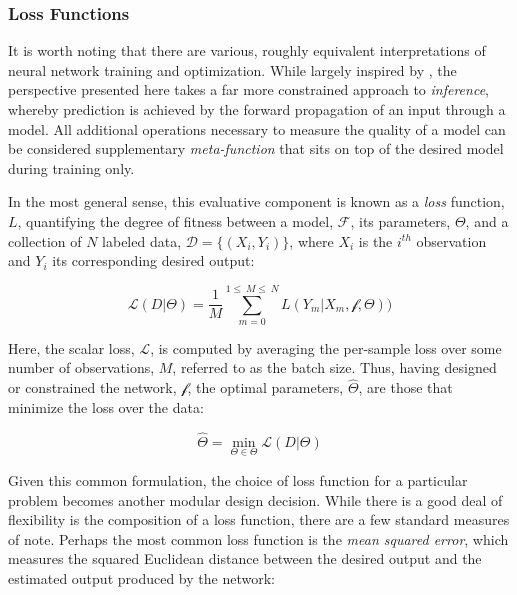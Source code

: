 \subsubsection{Loss Functions}

It is worth noting that there are various, roughly equivalent interpretations of neural network training and optimization.
While largely inspired by \cite{LeCun2006}, the perspective presented here takes a far more constrained approach to \emph{inference}, whereby prediction is achieved by the forward propagation of an input through a model.
All additional operations necessary to measure the quality of a model can be considered supplementary \emph{meta-function} that sits on top of the desired model during training only.

In the most general sense, this evaluative component is known as a \emph{loss} function, $L$, quantifying the degree of fitness between a model, $\mathcal{F}$, its parameters, $\Theta$, and a collection of $N$ labeled data, $\mathcal{D} = \{(X_i, Y_i) \}$, where $X_i$ is the $i^{th}$ observation and $Y_i$ its corresponding desired output:

\begin{equation}
\label{eq:genloss}
\mathcal{L}(D | \Theta) =  \frac{1}{M}\sum_{m=0}^{1\leq~M\leq~N}L(Y_m | X_m, \mathcal{f}, \Theta))
\end{equation}

\noindent Here, the scalar loss, $\mathcal{L}$, is computed by averaging the per-sample loss over some number of observations, $M$, referred to as the batch size.
Thus, having designed or constrained the network, $\mathcal{f}$, the optimal parameters, $\hat{\Theta}$, are those that minimize the loss over the data:

\begin{equation}
\label{eq:genloss}
\hat{\Theta} = \min\limits_{\Theta \in \mathcal{\Theta}}\mathcal{L}(D | \Theta)
\end{equation}

Given this common formulation, the choice of loss function for a particular problem becomes another modular design decision.
While there is a good deal of flexibility is the composition of a loss function, there are a few standard measures of note.
Perhaps the most common loss function is the \emph{mean squared error}, which measures the squared Euclidean distance between the desired output and the estimated output produced by the network:

